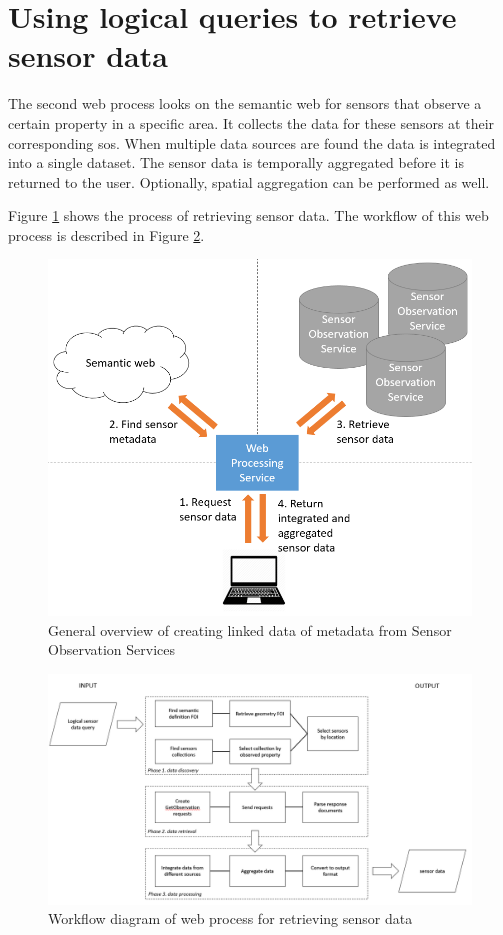 \section{Using logical queries to retrieve sensor data}
The second web process looks on the semantic web for sensors that observe a certain property in a specific area. It collects the data for these sensors at their corresponding \acl{sos}. When multiple data sources are found the data is integrated into a single dataset. The sensor data is temporally aggregated before it is returned to the user. Optionally, spatial aggregation can be performed as well.

Figure \ref{fig:WPS2} shows the process of retrieving sensor data. The workflow of this web process is described in Figure \ref{fig:WPS2workflow}.

\begin{figure}
	\centering
	\includegraphics[width=0.8\linewidth]{UML/wps2diagram.PNG}
	\caption{General overview of creating linked data of metadata from Sensor Observation Services}
	\label{fig:WPS2}
\end{figure}

\begin{figure}
	\centering
	\includegraphics[width=1\linewidth]{UML/wps2workflow.png}
	\caption{Workflow diagram of web process for retrieving sensor data}
	\label{fig:WPS2workflow}
\end{figure}

